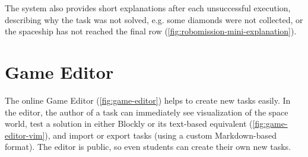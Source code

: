 The system also provides short explanations after each unsuccessful execution,
describing why the task was not solved,
e.g. some diamonds were not collected,
or the spaceship has not reached the final row
(\cref{fig:robomission-mini-explanation}).


\section{Game Editor}  %
\label{sec:robomission.task-editor}

The online Game Editor (\cref{fig:game-editor})
helps to create new tasks easily.
In the editor, the author of a task can immediately see visualization of the
space world,
test a solution in either Blockly or its text-based equivalent %
(\cref{fig:game-editor-vim}),
and import or export tasks (using a custom Markdown-based format).
The editor is public, so even students can create their own new tasks.


